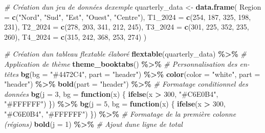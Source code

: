 \documentclass[
]{article}
\newenvironment{Shaded}{\begin{snugshade}}{\end{snugshade}}
\newcommand{\AttributeTok}[1]{\textcolor[rgb]{0.13,0.29,0.53}{#1}}
\newcommand{\CommentTok}[1]{\textcolor[rgb]{0.56,0.35,0.01}{\textit{#1}}}
\newcommand{\ControlFlowTok}[1]{\textcolor[rgb]{0.13,0.29,0.53}{\textbf{#1}}}
\newcommand{\DecValTok}[1]{\textcolor[rgb]{0.00,0.00,0.81}{#1}}
\newcommand{\FunctionTok}[1]{\textcolor[rgb]{0.13,0.29,0.53}{\textbf{#1}}}
\newcommand{\NormalTok}[1]{#1}
\newcommand{\OtherTok}[1]{\textcolor[rgb]{0.56,0.35,0.01}{#1}}
\newcommand{\SpecialCharTok}[1]{\textcolor[rgb]{0.81,0.36,0.00}{\textbf{#1}}}
\newcommand{\StringTok}[1]{\textcolor[rgb]{0.31,0.60,0.02}{#1}}
\begin{document}
\begin{Shaded}
\begin{Highlighting}[]
\CommentTok{\# Création d\textquotesingle{}un jeu de données d\textquotesingle{}exemple}
\NormalTok{quarterly\_data }\OtherTok{\textless{}{-}} \FunctionTok{data.frame}\NormalTok{(}
  \AttributeTok{Region =} \FunctionTok{c}\NormalTok{(}\StringTok{"Nord"}\NormalTok{, }\StringTok{"Sud"}\NormalTok{, }\StringTok{"Est"}\NormalTok{, }\StringTok{"Ouest"}\NormalTok{, }\StringTok{"Centre"}\NormalTok{),}
  \AttributeTok{T1\_2024 =} \FunctionTok{c}\NormalTok{(}\DecValTok{254}\NormalTok{, }\DecValTok{187}\NormalTok{, }\DecValTok{325}\NormalTok{, }\DecValTok{198}\NormalTok{, }\DecValTok{231}\NormalTok{),}
  \AttributeTok{T2\_2024 =} \FunctionTok{c}\NormalTok{(}\DecValTok{278}\NormalTok{, }\DecValTok{203}\NormalTok{, }\DecValTok{341}\NormalTok{, }\DecValTok{212}\NormalTok{, }\DecValTok{245}\NormalTok{),}
  \AttributeTok{T3\_2024 =} \FunctionTok{c}\NormalTok{(}\DecValTok{301}\NormalTok{, }\DecValTok{225}\NormalTok{, }\DecValTok{352}\NormalTok{, }\DecValTok{235}\NormalTok{, }\DecValTok{260}\NormalTok{),}
  \AttributeTok{T4\_2024 =} \FunctionTok{c}\NormalTok{(}\DecValTok{315}\NormalTok{, }\DecValTok{242}\NormalTok{, }\DecValTok{368}\NormalTok{, }\DecValTok{253}\NormalTok{, }\DecValTok{274}\NormalTok{)}
\NormalTok{)}

\CommentTok{\# Création d\textquotesingle{}un tableau flextable élaboré}
\FunctionTok{flextable}\NormalTok{(quarterly\_data) }\SpecialCharTok{\%\textgreater{}\%}
  \CommentTok{\# Application de thème}
  \FunctionTok{theme\_booktabs}\NormalTok{() }\SpecialCharTok{\%\textgreater{}\%}
  \CommentTok{\# Personnalisation des en{-}têtes}
  \FunctionTok{bg}\NormalTok{(}\AttributeTok{bg =} \StringTok{"\#4472C4"}\NormalTok{, }\AttributeTok{part =} \StringTok{"header"}\NormalTok{) }\SpecialCharTok{\%\textgreater{}\%}
  \FunctionTok{color}\NormalTok{(}\AttributeTok{color =} \StringTok{"white"}\NormalTok{, }\AttributeTok{part =} \StringTok{"header"}\NormalTok{) }\SpecialCharTok{\%\textgreater{}\%}
  \FunctionTok{bold}\NormalTok{(}\AttributeTok{part =} \StringTok{"header"}\NormalTok{) }\SpecialCharTok{\%\textgreater{}\%}
  \CommentTok{\# Formatage conditionnel des données}
  \FunctionTok{bg}\NormalTok{(}\AttributeTok{j =} \DecValTok{3}\NormalTok{, }\AttributeTok{bg =} \ControlFlowTok{function}\NormalTok{(x) \{}
    \FunctionTok{ifelse}\NormalTok{(x }\SpecialCharTok{\textgreater{}} \DecValTok{300}\NormalTok{, }\StringTok{"\#C6E0B4"}\NormalTok{, }\StringTok{"\#FFFFFF"}\NormalTok{)}
\NormalTok{  \}) }\SpecialCharTok{\%\textgreater{}\%}
  \FunctionTok{bg}\NormalTok{(}\AttributeTok{j =} \DecValTok{5}\NormalTok{, }\AttributeTok{bg =} \ControlFlowTok{function}\NormalTok{(x) \{}
    \FunctionTok{ifelse}\NormalTok{(x }\SpecialCharTok{\textgreater{}} \DecValTok{300}\NormalTok{, }\StringTok{"\#C6E0B4"}\NormalTok{, }\StringTok{"\#FFFFFF"}\NormalTok{)}
\NormalTok{  \}) }\SpecialCharTok{\%\textgreater{}\%}
  \CommentTok{\# Formatage de la première colonne (régions)}
  \FunctionTok{bold}\NormalTok{(}\AttributeTok{j =} \DecValTok{1}\NormalTok{) }\SpecialCharTok{\%\textgreater{}\%}
  \CommentTok{\# Ajout d\textquotesingle{}une ligne de total}
  

\end{Highlighting}
\end{Shaded}
\end{document}
